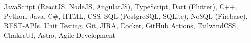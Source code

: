 JavaScript (ReactJS, NodeJS, AngularJS), TypeScript, Dart (Flutter), C++, Python, Java, C\#, HTML, CSS, SQL (PostgreSQL, SQLite), NoSQL (Firebase), REST-APIs, Unit Testing, Git, JIRA, Docker, GitHub Actions, TailwindCSS, ChakraUI, Astro, Agile Development
